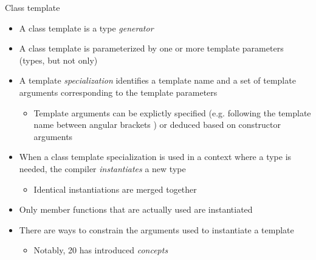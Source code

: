 \begin{frame}{Class template \insertcontinuationtext}
  \begin{itemize}
  \item A class template is a type \textit{generator}
  \item A class template is parameterized by one or more template parameters
    (types, but not only)
  \item A template \textit{specialization} identifies a template name and a set
    of template arguments corresponding to the template parameters
    \begin{itemize}
    \item Template arguments can be explictly specified (e.g. following the
      template name between angular brackets \code{<>}) or deduced based on
      constructor arguments
    \end{itemize}
  \item When a class template specialization is used in a context where a type
    is needed, the compiler \textit{instantiates} a new type
    \begin{itemize}
    \item Identical instantiations are merged together
    \end{itemize}
  \item Only member functions that are actually used are instantiated
  \item There are ways to constrain the arguments used to instantiate a template
    \begin{itemize}
    \item Notably, \Cpp{}20 has introduced \textit{concepts}
    \end{itemize}
  \end{itemize}
\end{frame}

